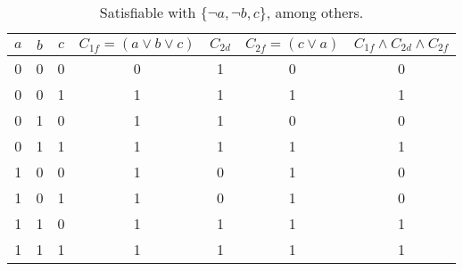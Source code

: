 \documentclass{article}
\begin{document}
\begin{enumerate}
    \begin{table}[h]
        \centering
        \begin{tabular}{c c c | c c c | c}\toprule
            $a$ & $b$ & $c$ & $C_{1f} = (a \lor b \lor c)$ & $C_{2d}$ & $C_{2f} = (c \lor a)$ & $C_{1f} \land C_{2d} \land C_{2f}$ \\\midrule
            0 & 0 & 0 & 0 & 1 & 0 & 0 \\
            0 & 0 & 1 & 1 & 1 & 1 & 1 \\
            0 & 1 & 0 & 1 & 1 & 0 & 0 \\
            0 & 1 & 1 & 1 & 1 & 1 & 1 \\
            1 & 0 & 0 & 1 & 0 & 1 & 0 \\
            1 & 0 & 1 & 1 & 0 & 1 & 0 \\
            1 & 1 & 0 & 1 & 1 & 1 & 1 \\
            1 & 1 & 1 & 1 & 1 & 1 & 1 \\\bottomrule
        \end{tabular}
        \caption{Satisfiable with $\{\neg a, \neg b, c\}$, among others.}
    \end{table}
    

\end{enumerate}
\end{document}
